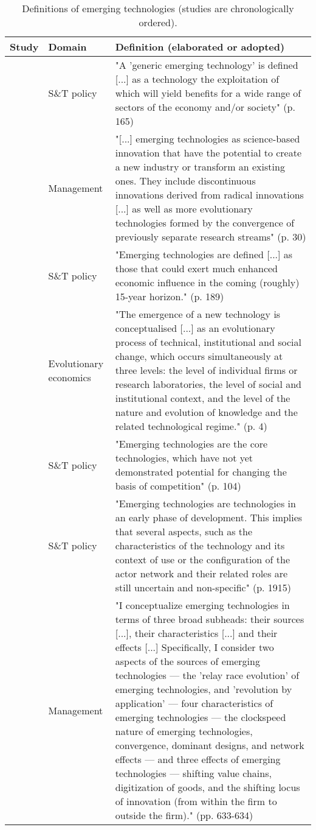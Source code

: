 \documentclass[11pt]{article}
\begin{document}
\setlength{\tabcolsep}{10pt}
\renewcommand{\arraystretch}{1.4}
\begin{table}\footnotesize
	\caption{\label{tab:techemergence}Definitions of emerging technologies (studies are chronologically ordered).}
	\centering
{\begin{tabular}{C{2cm}C{2cm} p{10cm}}
\hline\hline
\textbf{Study}& \textbf{Domain} & \textbf{Definition} (elaborated or adopted)\\
\hline
\cite{Martin1995} & S\&T policy 	& "A 'generic emerging technology' is defined [...] as a technology the exploitation of which will yield benefits for a wide range of sectors of the economy and/or society" (p. 165)\\
\cite{Day2000}	& Management & 	"[...] emerging technologies as science-based innovation that have the potential to create a new industry or transform an existing ones. They include discontinuous innovations derived from radical innovations [...] as well as more evolutionary technologies formed by the convergence of previously separate research streams" (p. 30)\\
\cite{Porter2002} & S\&T policy & "Emerging technologies are defined [...] as those that could exert much enhanced economic influence in the coming (roughly) 15-year horizon." (p. 189)\\
\cite{Corrocher2003} & Evolutionary economics	& "The emergence of a new technology is conceptualised [...] as an evolutionary process of technical, institutional and social change, which occurs simultaneously at three levels: the level of individual firms or research laboratories, the level of social and institutional context, and the level of the nature and evolution of knowledge and the related technological regime." (p. 4) \\
\cite{Hung2006} & S\&T policy & "Emerging technologies are the core technologies, which have not yet demonstrated potential for changing the basis of competition" (p. 104)\\
\cite{Boon2008} & S\&T policy & "Emerging technologies are technologies in an early phase of development. This implies that several aspects, such as the characteristics of the technology and its context of use or the configuration of the actor network and their related roles are still uncertain and non-specific" (p. 1915)\\
\cite{Srinivasan2008} & Management & "I conceptualize emerging technologies in terms of three broad subheads: their sources [...], their characteristics [...] and their effects [...] Specifically, I consider two aspects of the sources of emerging technologies --- the 'relay race evolution' of emerging technologies, and 'revolution by application' --- four characteristics of emerging technologies --- the clockspeed nature of emerging technologies, convergence, dominant designs, and network effects --- and three effects of emerging technologies --- shifting value chains, digitization of goods, and the shifting locus of innovation (from within the firm to outside the firm)." (pp. 633-634)	\\

\end{tabular}}
\end{table}
\end{document}
